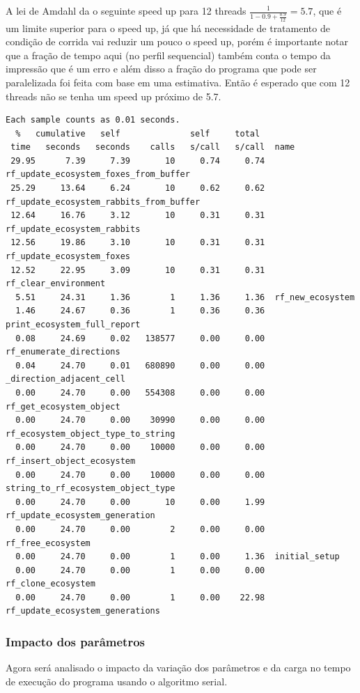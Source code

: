 \documentclass{article}
\begin{document}
A lei de Amdahl da o seguinte speed up para 12 threads $\frac{1}{1-0.9+\frac{0.9}{12}} = 5.7$, que é um limite superior para o speed up, já que há necessidade de tratamento de condição de corrida vai reduzir um pouco o speed up, porém é importante notar que a fração de tempo aqui (no perfil sequencial) também conta o tempo da impressão que é um erro e além disso a fração do programa que pode ser paralelizada foi feita com base em uma estimativa. Então é esperado que com 12 threads não se tenha um speed up próximo de 5.7.

	{
		\scriptsize
		\begin{verbatim}
Each sample counts as 0.01 seconds.
  %   cumulative   self              self     total           
 time   seconds   seconds    calls   s/call   s/call  name    
 29.95      7.39     7.39       10     0.74     0.74  rf_update_ecosystem_foxes_from_buffer
 25.29     13.64     6.24       10     0.62     0.62  rf_update_ecosystem_rabbits_from_buffer
 12.64     16.76     3.12       10     0.31     0.31  rf_update_ecosystem_rabbits
 12.56     19.86     3.10       10     0.31     0.31  rf_update_ecosystem_foxes
 12.52     22.95     3.09       10     0.31     0.31  rf_clear_environment
  5.51     24.31     1.36        1     1.36     1.36  rf_new_ecosystem
  1.46     24.67     0.36        1     0.36     0.36  print_ecosystem_full_report
  0.08     24.69     0.02   138577     0.00     0.00  rf_enumerate_directions
  0.04     24.70     0.01   680890     0.00     0.00  _direction_adjacent_cell
  0.00     24.70     0.00   554308     0.00     0.00  rf_get_ecosystem_object
  0.00     24.70     0.00    30990     0.00     0.00  rf_ecosystem_object_type_to_string
  0.00     24.70     0.00    10000     0.00     0.00  rf_insert_object_ecosystem
  0.00     24.70     0.00    10000     0.00     0.00  string_to_rf_ecosystem_object_type
  0.00     24.70     0.00       10     0.00     1.99  rf_update_ecosystem_generation
  0.00     24.70     0.00        2     0.00     0.00  rf_free_ecosystem
  0.00     24.70     0.00        1     0.00     1.36  initial_setup
  0.00     24.70     0.00        1     0.00     0.00  rf_clone_ecosystem
  0.00     24.70     0.00        1     0.00    22.98  rf_update_ecosystem_generations
\end{verbatim}
	}
\subsubsection{Impacto dos parâmetros}

Agora será analisado o impacto da variação dos parâmetros e da carga no tempo de execução do programa usando o algoritmo serial.
\end{document}
